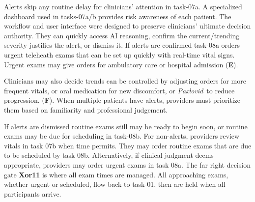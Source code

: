 Alerts skip any routine delay for clinicians' attention in task-07a. A specialized dashboard used in tasks-07a/b provides risk awareness of each patient.
The workflow and user interface were designed to preserve clinicians' ultimate decision authority.
They can quickly access AI reasoning, confirm the current/trending severity justifies the alert, or dismiss it.
If alerts are confirmed task-08a orders urgent teleheath exams that can be set up quickly with real-time vital signs.
Urgent exams may give orders for ambulatory care or hospital admission (\textbf{E}).

Clinicians may also decide trends can be controlled by adjusting orders for more frequent vitals, or oral medication for new discomfort, or \emph{Paxlovid}\textsuperscript{\texttrademark}\ to reduce progression. (\textbf{F}).
When multiple patients have alerts, providers must prioritize them based on familiarity and professional judgement.

If alerts are dismissed routine exams still may be ready to begin soon, or routine exams may be due for scheduling in task-08b. 
For non-alerts, providers review vitals in task 07b when time permits. They may order routine exams that are due to be scheduled by task 08b.
Alternatively, if clinical judgment deems appropriate, providers may order urgent exams in task 08a.
The far right decision gate \textbf{Xor11} is where all exam times are managed.
All approaching exams, whether urgent or scheduled, flow back to task-01, then are held when all participants arrive.